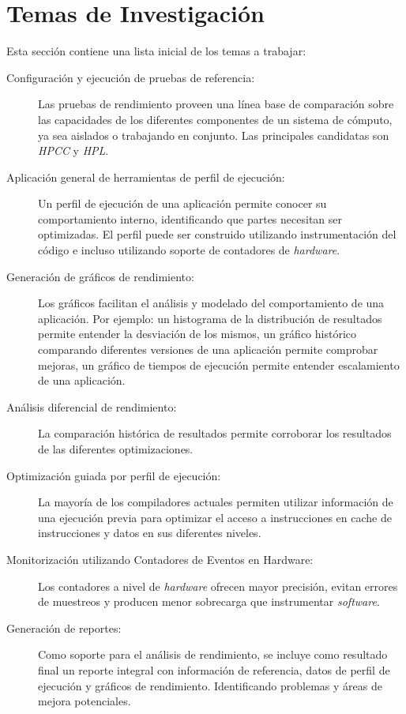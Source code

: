 \documentclass[a4paper]{article}
\begin{document}
\section{Temas de Investigación}

Esta sección contiene una lista inicial de los temas a trabajar:

\begin{description}
\item[Configuración y ejecución de pruebas de referencia:]

Las pruebas de rendimiento proveen una línea base de comparación sobre las capacidades de los diferentes componentes de un sistema de cómputo, ya sea aislados o trabajando en conjunto. Las principales candidatas son {\it HPCC} y {\it HPL}.

\item[Aplicación general de herramientas de perfil de ejecución:]

Un perfil de ejecución de una aplicación permite conocer su comportamiento interno, identificando que partes necesitan ser optimizadas. El perfil puede ser construido utilizando instrumentación del código e incluso utilizando soporte de contadores de {\it hardware}.

\item[Generación de gráficos de rendimiento:]

Los gráficos facilitan el análisis y modelado del comportamiento de una aplicación. Por ejemplo: un histograma de la distribución de resultados permite entender la desviación de los mismos, un gráfico histórico comparando diferentes versiones de una aplicación permite comprobar mejoras, un gráfico de tiempos de ejecución permite entender escalamiento de una aplicación.

\item[Análisis diferencial de rendimiento:]

La comparación histórica de resultados permite corroborar los resultados de las diferentes optimizaciones.

\item[Optimización guiada por perfil de ejecución:]

La mayoría de los compiladores actuales permiten utilizar información de una ejecución previa para optimizar el acceso a instrucciones en cache de instrucciones y datos en sus diferentes niveles.

\item[Monitorización utilizando Contadores de Eventos en Hardware:]

Los contadores a nivel de {\it hardware} ofrecen mayor precisión, evitan errores de muestreos y producen menor sobrecarga que instrumentar {\it software}.

\item[Generación de reportes:]

Como soporte para el análisis de rendimiento, se incluye como resultado final un reporte integral con información de referencia, datos de perfil de ejecución y gráficos de rendimiento. Identificando problemas y áreas de mejora potenciales.

\end{description}
\end{document}

